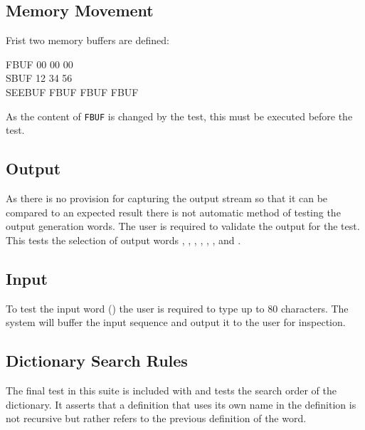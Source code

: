 \subsection{Memory Movement}

Frist two memory buffers are defined:

\begin{tt}
 FBUF 00  00  00  \\
 SBUF 12  34  56  \\
\word{:} SEEBUF FBUF   FBUF    FBUF    \word{;}
\end{tt}

As the content of \texttt{FBUF} is changed by the
 test, this must be executed before the
\linebreak {} test.

\subsection{Output}

As there is no provision for capturing the output stream so that it
can be compared to an expected result there is not automatic method
of testing the output generation words.  The user is required to
validate the output for the  test.  This tests
the selection of output words , , ,
, , , and .

\subsection{Input}

To test the input word () the user is
required to type up to 80 characters.  The system will buffer the
input sequence and output it to the user for inspection.

\subsection{Dictionary Search Rules}

The final test in this suite is included with  and
tests the search order of the dictionary.  It asserts that a
definition that uses its own name in the definition is not recursive
but rather refers to the previous definition of the word.

